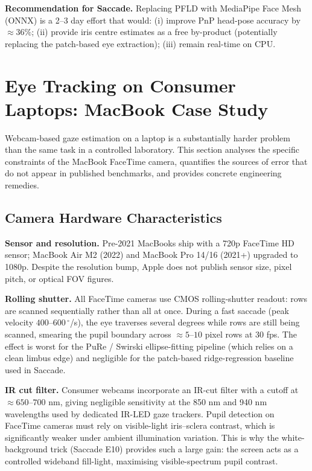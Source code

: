 \documentclass[11pt,a4paper]{article}
\begin{document}
\noindent\textbf{Recommendation for Saccade.}
Replacing PFLD with MediaPipe Face Mesh (ONNX) is a 2--3 day effort that would:
(i) improve PnP head-pose accuracy by $\approx36\%$;
(ii) provide iris centre estimates as a free by-product (potentially replacing the patch-based eye extraction);
(iii) remain real-time on CPU.

\section{Eye Tracking on Consumer Laptops: MacBook Case Study}
\label{sec:macbook}

Webcam-based gaze estimation on a laptop is a substantially harder problem than
the same task in a controlled laboratory.
This section analyses the specific constraints of the MacBook FaceTime camera,
quantifies the sources of error that do not appear in published benchmarks,
and provides concrete engineering remedies.

\subsection{Camera Hardware Characteristics}

\textbf{Sensor and resolution.}
Pre-2021 MacBooks ship with a 720p FaceTime HD sensor; MacBook Air M2 (2022) and
MacBook Pro 14/16 (2021+) upgraded to 1080p.
Despite the resolution bump, Apple does not publish sensor size, pixel pitch,
or optical FOV figures.

\textbf{Rolling shutter.}
All FaceTime cameras use CMOS rolling-shutter readout: rows are scanned sequentially
rather than all at once.
During a fast saccade (peak velocity $400$--$600\,^\circ$/s), the eye traverses
several degrees while rows are still being scanned, smearing the pupil boundary
across $\approx5$--$10$ pixel rows at 30 fps.
The effect is worst for the PuRe / Swirski ellipse-fitting pipeline
(which relies on a clean limbus edge) and negligible for the patch-based
ridge-regression baseline used in Saccade.

\textbf{IR cut filter.}
Consumer webcams incorporate an IR-cut filter with a cutoff at $\approx650$--$700$ nm,
giving negligible sensitivity at the 850 nm and 940 nm wavelengths used by dedicated
IR-LED gaze trackers.
Pupil detection on FaceTime cameras must rely on visible-light iris--sclera contrast,
which is significantly weaker under ambient illumination variation.
This is why the white-background trick (Saccade E10) provides such a large gain:
the screen acts as a controlled wideband fill-light, maximising visible-spectrum
pupil contrast.
\end{document}
